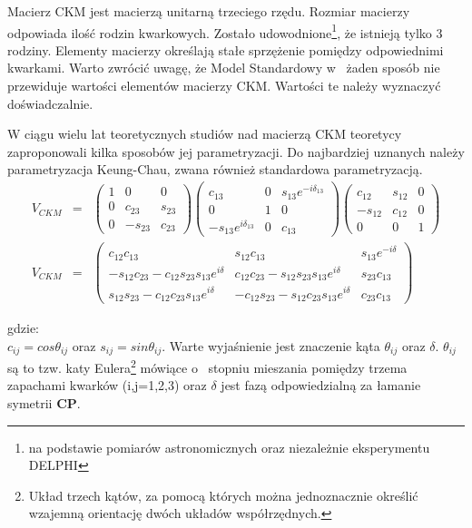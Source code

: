 Macierz CKM jest macierzą unitarną trzeciego rzędu. Rozmiar macierzy odpowiada ilość rodzin kwarkowych. Zostało udowodnione\footnote{na podstawie pomiarów astronomicznych oraz niezależnie eksperymentu DELPHI\cite{delphi} }, że istnieją tylko 3 rodziny. Elementy macierzy określają stałe sprzężenie pomiędzy odpowiednimi kwarkami. Warto zwrócić uwagę, że Model Standardowy w~ żaden sposób nie przewiduje wartości elementów macierzy CKM. Wartości te należy wyznaczyć doświadczalnie. 

W ciągu wielu lat teoretycznych studiów nad macierzą CKM teoretycy zaproponowali kilka sposobów jej parametryzacji. Do najbardziej uznanych należy parametryzacja Keung-Chau, zwana również standardowa parametryzacją. 
\begin{eqnarray}
V_{CKM}&=&\begin{pmatrix} 1 & 0 & 0 \\ 0 & c_{23} & s_{23} \\ 0 & -s_{23} & c_{23} \end{pmatrix}
 \begin{pmatrix} c_{13} & 0 & s_{13}e^{-i\delta_{13}} \\ 0 & 1 & 0 \\ -s_{13}e^{i\delta_{13}} & 0 & c_{13} \end{pmatrix}
 \begin{pmatrix} c_{12} & s_{12} & 0 \\ -s_{12} & c_{12} & 0 \\ 0 & 0 & 1 \end{pmatrix} \nonumber \\
V_{CKM}&=&\begin{pmatrix}
c_{12}c_{13}&s_{12}c_{13}& s_{13}e^{-i\delta} \\
 -s_{12}c_{23}-c_{12}s_{23}s_{13}e^{i\delta} & c_{12}c_{23}-s_{12}s_{23}s_{13}e^{i\delta}  & s_{23}c_{13}\\ s_{12}s_{23}-c_{12}c_{23}s_{13}e^{i\delta} & -c_{12}s_{23}-s_{12}c_{23}s_{13}e^{i\delta} & c_{23}c_{13}
\end{pmatrix}
\end{eqnarray}

gdzie:\\
$c_{ij}=cos\theta_{ij}$ oraz $s_{ij}=sin\theta_{ij}$. Warte wyjaśnienie jest znaczenie kąta $\theta_{ij}$ oraz $\delta$. $\theta_{ij}$ są to tzw. katy Eulera\footnote{Układ trzech kątów, za pomocą których można jednoznacznie określić wzajemną orientację dwóch układów współrzędnych.} mówiące o~ stopniu mieszania pomiędzy trzema zapachami kwarków (i,j=1,2,3) oraz $\delta$ jest fazą odpowiedzialną za łamanie symetrii \textbf{CP}.

